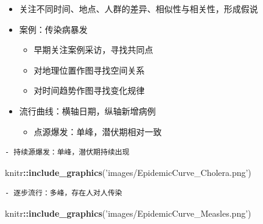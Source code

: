 \documentclass[]{book}
\newenvironment{Shaded}{\begin{snugshade}}{\end{snugshade}}
\newcommand{\KeywordTok}[1]{\textcolor[rgb]{0.13,0.29,0.53}{\textbf{#1}}}
\newcommand{\NormalTok}[1]{#1}
\newcommand{\OperatorTok}[1]{\textcolor[rgb]{0.81,0.36,0.00}{\textbf{#1}}}
\newcommand{\StringTok}[1]{\textcolor[rgb]{0.31,0.60,0.02}{#1}}
\providecommand{\tightlist}{%
  \setlength{\itemsep}{0pt}\setlength{\parskip}{0pt}}
\begin{document}
\begin{itemize}
\tightlist
\item
  关注不同时间、地点、人群的差异、相似性与相关性，形成假说
\item
  案例：传染病暴发

  \begin{itemize}
  \tightlist
  \item
    早期关注案例采访，寻找共同点
  \item
    对地理位置作图寻找空间关系
  \item
    对时间趋势作图寻找变化规律
  \end{itemize}
\item
  流行曲线：横轴日期，纵轴新增病例

  \begin{itemize}
  \tightlist
  \item
    点源爆发：单峰，潜伏期相对一致
  \end{itemize}
\end{itemize}

\begin{Shaded}
\end{Shaded}

\begin{verbatim}
- 持续源爆发：单峰，潜伏期持续出现
\end{verbatim}

\begin{Shaded}
\begin{Highlighting}[]
\NormalTok{knitr}\OperatorTok{::}\KeywordTok{include_graphics}\NormalTok{(}\StringTok{'images/EpidemicCurve_Cholera.png'}\NormalTok{)}
\end{Highlighting}
\end{Shaded}

\begin{verbatim}
- 逐步流行：多峰，存在人对人传染
\end{verbatim}

\begin{Shaded}
\begin{Highlighting}[]
\NormalTok{knitr}\OperatorTok{::}\KeywordTok{include_graphics}\NormalTok{(}\StringTok{'images/EpidemicCurve_Measles.png'}\NormalTok{)}
\end{Highlighting}
\end{Shaded}
\end{document}
